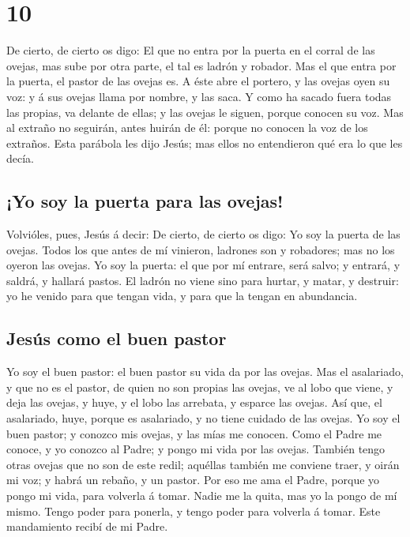 \hypertarget{section-43-10}{%
\section{10}\label{section-43-10}}

 De cierto, de cierto os digo: El que no entra por la
puerta en el corral de las ovejas, mas sube por otra parte, el tal es
ladrón y robador.  Mas el que entra por la puerta, el
pastor de las ovejas es.  A éste abre el portero, y las
ovejas oyen su voz: y á sus ovejas llama por nombre, y las saca.
 Y como ha sacado fuera todas las propias, va delante de
ellas; y las ovejas le siguen, porque conocen su voz.  Mas
al extraño no seguirán, antes huirán de él: porque no conocen la voz de
los extraños.  Esta parábola les dijo Jesús; mas ellos no
entendieron qué era lo que les decía.

\hypertarget{yo-soy-la-puerta-para-las-ovejas}{%
\subsection{¡Yo soy la puerta para las
ovejas!}\label{yo-soy-la-puerta-para-las-ovejas}}

 Volvióles, pues, Jesús á decir: De cierto, de cierto os
digo: Yo soy la puerta de las ovejas.  Todos los que antes
de mí vinieron, ladrones son y robadores; mas no los oyeron las ovejas.
 Yo soy la puerta: el que por mí entrare, será salvo; y
entrará, y saldrá, y hallará pastos.  El ladrón no viene
sino para hurtar, y matar, y destruir: yo he venido para que tengan
vida, y para que la tengan en abundancia.

\hypertarget{jesuxfas-como-el-buen-pastor}{%
\subsection{Jesús como el buen
pastor}\label{jesuxfas-como-el-buen-pastor}}

 Yo soy el buen pastor: el buen pastor su vida da por las
ovejas.  Mas el asalariado, y que no es el pastor, de
quien no son propias las ovejas, ve al lobo que viene, y deja las
ovejas, y huye, y el lobo las arrebata, y esparce las ovejas.
 Así que, el asalariado, huye, porque es asalariado, y no
tiene cuidado de las ovejas.  Yo soy el buen pastor; y
conozco mis ovejas, y las mías me conocen.  Como el Padre
me conoce, y yo conozco al Padre; y pongo mi vida por las ovejas.
 También tengo otras ovejas que no son de este redil;
aquéllas también me conviene traer, y oirán mi voz; y habrá un rebaño, y
un pastor.  Por eso me ama el Padre, porque yo pongo mi
vida, para volverla á tomar.  Nadie me la quita, mas yo
la pongo de mí mismo. Tengo poder para ponerla, y tengo poder para
volverla á tomar. Este mandamiento recibí de mi Padre.

